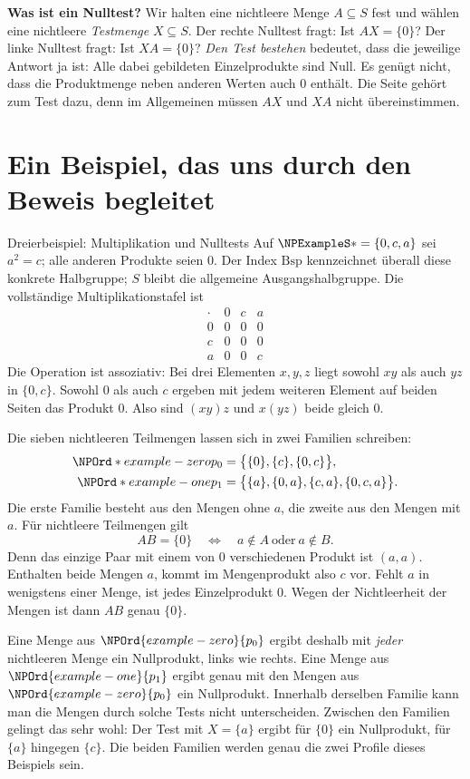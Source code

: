 \medskip\noindent\textbf{Was ist ein Nulltest?}
Wir halten eine nichtleere Menge \(A\subseteq S\) fest und wählen
eine nichtleere \emph{Testmenge} \(X\subseteq S\).
Der rechte Nulltest fragt: Ist \(AX=\{0\}\)?
Der linke Nulltest fragt: Ist \(XA=\{0\}\)?
\emph{Den Test bestehen} bedeutet, dass die jeweilige Antwort ja ist:
Alle dabei gebildeten Einzelprodukte sind Null.
Es genügt nicht, dass die Produktmenge neben anderen Werten auch \(0\)
enthält. Die Seite gehört zum Test dazu, denn im Allgemeinen müssen
\(AX\) und \(XA\) nicht übereinstimmen.

\section*{Ein Beispiel, das uns durch den Beweis begleitet}

\begin{NPReadingExample}{Dreierbeispiel: Multiplikation und Nulltests}
Auf \(\NPExampleS*=\{0,c,a\}\) sei \(a^2=c\); alle anderen Produkte seien \(0\).
Der Index \(\mathrm{Bsp}\) kennzeichnet überall diese konkrete
Halbgruppe; \(S\) bleibt die allgemeine Ausgangshalbgruppe.
Die vollständige Multiplikationstafel ist
\[
 \begin{array}{c|ccc}
 \cdot&0&c&a\\\hline
 0&0&0&0\\
 c&0&0&0\\
 a&0&0&c
 \end{array}
\]
Die Operation ist assoziativ: Bei drei Elementen \(x,y,z\) liegt sowohl
\(xy\) als auch \(yz\) in \(\{0,c\}\). Sowohl \(0\) als auch \(c\)
ergeben mit jedem weiteren Element auf beiden Seiten das Produkt \(0\).
Also sind \((xy)z\) und \(x(yz)\) beide gleich \(0\).

Die sieben nichtleeren Teilmengen lassen sich in zwei Familien schreiben:
\[
 \begin{aligned}
 \NPOrd*{example-zero}{p_0}&=\bigl\{\{0\},\{c\},\{0,c\}\bigr\},\\
 \NPOrd*{example-one}{p_1}&=\bigl\{\{a\},\{0,a\},\{c,a\},\{0,c,a\}\bigr\}.
 \end{aligned}
\]
Die erste Familie besteht aus den Mengen ohne \(a\), die zweite aus
den Mengen mit \(a\). Für nichtleere Teilmengen gilt
\[
 AB=\{0\}\quad\Longleftrightarrow\quad
 a\notin A\ \text{oder}\ a\notin B.
\]
Denn das einzige Paar mit einem von \(0\) verschiedenen Produkt ist
\((a,a)\). Enthalten beide Mengen \(a\), kommt im Mengenprodukt also
\(c\) vor. Fehlt \(a\) in wenigstens einer Menge, ist jedes Einzelprodukt
\(0\). Wegen der Nichtleerheit der Mengen ist dann \(AB\) genau \(\{0\}\).

Eine Menge aus \(\NPOrd{example-zero}{p_0}\) ergibt deshalb mit \emph{jeder} nichtleeren
Menge ein Nullprodukt, links wie rechts. Eine Menge aus \(\NPOrd{example-one}{p_1}\) ergibt
genau mit den Mengen aus \(\NPOrd{example-zero}{p_0}\) ein Nullprodukt. Innerhalb derselben
Familie kann man die Mengen durch solche Tests nicht unterscheiden.
Zwischen den Familien gelingt das sehr wohl: Der Test mit \(X=\{a\}\)
ergibt für \(\{0\}\) ein Nullprodukt, für \(\{a\}\) hingegen \(\{c\}\).
Die beiden Familien werden genau die zwei Profile dieses Beispiels sein.
\end{NPReadingExample}

